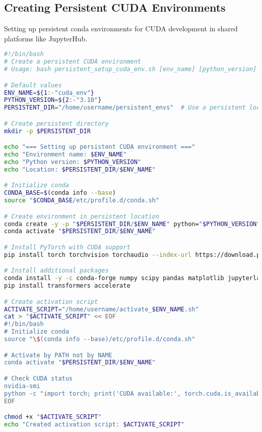 \documentclass{article}
\begin{document}
\subsection{Creating Persistent CUDA Environments}
Setting up persistent conda environments for CUDA development in shared platforms like JupyterHub.

\begin{tcolorbox}[colback=orange!5!white, colframe=orange!75!black, title=Persistent CUDA Environment Setup]
\begin{lstlisting}[language=bash]
#!/bin/bash
# Create a persistent CUDA environment
# Usage: bash persistent_setup_cuda_env.sh [env_name] [python_version]

# Default values
ENV_NAME=${1:-"cuda_env"}
PYTHON_VERSION=${2:-"3.10"}
PERSISTENT_DIR="/home/username/persistent_envs"  # Use a persistent location

# Create persistent directory
mkdir -p $PERSISTENT_DIR

echo "=== Setting up persistent CUDA environment ==="
echo "Environment name: $ENV_NAME"
echo "Python version: $PYTHON_VERSION"
echo "Location: $PERSISTENT_DIR/$ENV_NAME"

# Initialize conda
CONDA_BASE=$(conda info --base)
source "$CONDA_BASE/etc/profile.d/conda.sh"

# Create environment in persistent location
conda create -y -p "$PERSISTENT_DIR/$ENV_NAME" python="$PYTHON_VERSION"
conda activate "$PERSISTENT_DIR/$ENV_NAME"

# Install PyTorch with CUDA support
pip install torch torchvision torchaudio --index-url https://download.pytorch.org/whl/cu124

# Install additional packages
conda install -y -c conda-forge numpy scipy pandas matplotlib jupyterlab
pip install transformers accelerate

# Create activation script
ACTIVATE_SCRIPT="/home/username/activate_$ENV_NAME.sh"
cat > "$ACTIVATE_SCRIPT" << EOF
#!/bin/bash
# Initialize conda
source "\$(conda info --base)/etc/profile.d/conda.sh"

# Activate by PATH not by NAME
conda activate "$PERSISTENT_DIR/$ENV_NAME"

# Check CUDA status
nvidia-smi
python -c "import torch; print('CUDA available:', torch.cuda.is_available())"
EOF

chmod +x "$ACTIVATE_SCRIPT"
echo "Created activation script: $ACTIVATE_SCRIPT"
\end{lstlisting}
\end{tcolorbox}
\end{document}
